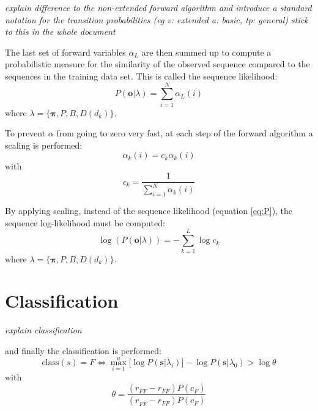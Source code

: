 \documentclass[mscthesis]{usiinfthesis}
\begin{document}
\emph{\color{red}explain difference to the non-extended forward algorithm and
    introduce a standard notation for the transition probabilities (eg v: extended
a: basic, tp: general) stick to this in the whole document}

The last set of forward variables $ \alpha_L $ are then summed up to compute
a probabilistic measure for the similarity of the observed sequence compared to
the sequences in the training data set. This is called the sequence likelihood:
\begin{equation}
    \label{eq:P}
    P(\boldsymbol{o}|\lambda) = \sum\limits_{i=1}^{N} \alpha_L(i)
\end{equation}
where $ \lambda = \{\boldsymbol{\pi}, P, B, D(d_k) \} $.

To prevent $ \alpha $ from going to zero very fast, at each step of the forward
algorithm a scaling is performed:
\begin{equation}
    \label{eq:scaled}
    \alpha_k(i) = c_k \alpha_k(i)
\end{equation}
with
\begin{equation}
    \label{eq:scaling_factor}
    c_k = \frac{1}{\sum\limits_{i=1}^{N} \alpha_k(i)}
\end{equation}

By applying scaling, instead of the sequence likelihood (equation \ref{eq:P}),
the sequence log-likelihood must be computed:
\begin{equation}
    \label{eq:Plog}
    \log(P(\boldsymbol{o}|\lambda)) = -\sum\limits_{k=1}^{L} \log c_k
\end{equation}
where $ \lambda = \{\boldsymbol{\pi}, P, B, D(d_k) \} $.

\section{Classification}
\label{ch:event_class}

\emph{\color{red}explain classification}

and finally the
classification is performed:
\begin{equation}
    \label{eq:class}
    \text{class}(s) = F \iff \max_{i=1}^{u} \big [
        \log P(\boldsymbol{s}|\lambda_i)
    \big ] - \log P(\boldsymbol{s}|\lambda_0) > \log \theta
\end{equation}
with
\begin{equation}
    \label{eq:class_thresh}
    \theta = \frac{(r_{\bar{F}F} - r_{\bar{F}\bar{F}})P(c_{\bar{F}})}
        {(r_{F \bar{F}} - r_{FF})P(c_{F})}
\end{equation}
\end{document}
